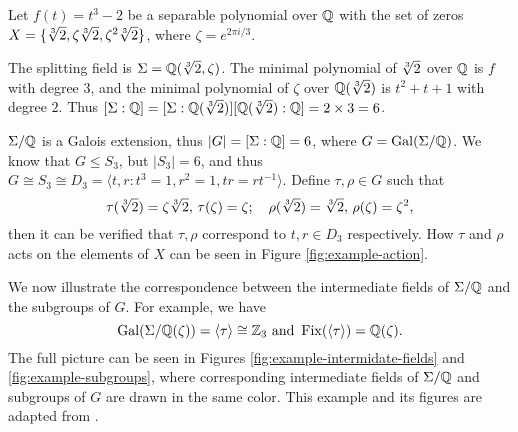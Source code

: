 \begin{example}
	
	Let $f(t) = t^3 - 2$ be a separable polynomial over $\mathbb Q$ with the set of zeros $X = \{ \sqrt[3]{2}, \zeta \sqrt[3]{2}, \zeta^2 \sqrt[3]{2} \}$, where $\zeta = e^{2\pi i / 3}$. 
	
	The splitting field is $\Sigma = \mathbb Q(\sqrt[3]{2}, \zeta)$. The minimal polynomial of $\sqrt[3]{2}$ over $\mathbb Q$ is $f$ with degree $3$, and the minimal polynomial of $\zeta$ over $\mathbb Q(\sqrt[3]{2})$ is $t^2 + t + 1$ with degree $2$. Thus $[\Sigma : \mathbb Q] = [\Sigma : \mathbb Q(\sqrt[3]{2})] [\mathbb Q(\sqrt[3]{2}) : \mathbb Q] = 2 \times 3 = 6$. 
	
	$\Sigma / \mathbb Q$ is a Galois extension, thus $|G| = [\Sigma : \mathbb Q] = 6$, where $G = \operatorname{Gal}(\Sigma / \mathbb Q)$. We know that $G \le S_3$, but $|S_3| = 6$, and thus $G \cong S_3 \cong D_3 = \langle t, r : t^3 = 1, r^2 = 1, tr = rt^{-1} \rangle$. Define $\tau, \rho \in G$ such that 
	$$
		\tau(\sqrt[3]{2}) = \zeta \sqrt[3]{2}, \, \tau(\zeta) = \zeta; \quad \rho(\sqrt[3]{2}) = \sqrt[3]{2}, \,  \rho(\zeta) = \zeta ^ 2,
	$$
	then it can be verified that $\tau, \rho$ correspond to $t, r \in D_3$ respectively. How $\tau$ and $\rho$ acts on the elements of $X$ can be seen in Figure \ref{fig:example-action}.
	
	We now illustrate the correspondence between the intermediate fields of $\Sigma / \mathbb Q$ and the subgroups of $G$. For example, we have $$\operatorname{Gal}(\Sigma / \mathbb Q(\zeta)) = \langle \tau \rangle \cong \mathbb Z_3 \text{ and } \operatorname{Fix}(\langle \tau \rangle) = \mathbb Q(\zeta). $$ The full picture can be seen in Figures \ref{fig:example-intermidate-fields} and \ref{fig:example-subgroups}, where corresponding intermediate fields of $\Sigma / \mathbb Q$ and subgroups of $G$ are drawn in the same color. This example and its figures are adapted from \cite{visual-algebra}. 
	
\end{example}

